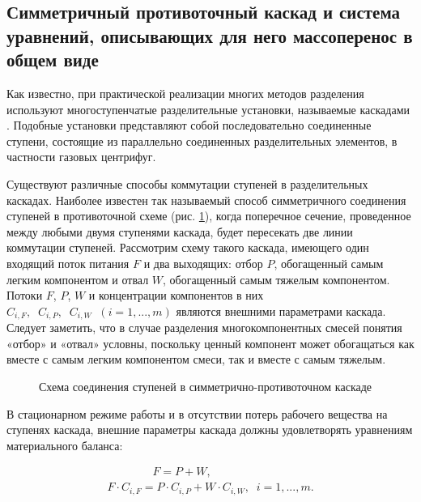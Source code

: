 \subsection{Симметричный противоточный каскад и система уравнений, описывающих для него массоперенос в общем виде}

Как известно, при практической реализации многих методов разделения используют многоступенчатые разделительные установки, называемые каскадами \cite{sulaberidzeTeoriyaKaskadovDlya2011}. Подобные установки представляют собой последовательно соединенные ступени, состоящие из параллельно соединенных разделительных элементов, в частности газовых центрифуг.

Существуют различные способы коммутации ступеней в разделительных каскадах. Наиболее известен так называемый способ симметричного соединения ступеней в противоточной схеме (рис. \ref{1_2}), когда поперечное сечение, проведенное между любыми двумя ступенями каскада, будет пересекать две линии коммутации ступеней. Рассмотрим схему такого каскада, имеющего один входящий поток питания $F$ и два выходящих: отбор $P$, обогащенный самым легким компонентом и отвал $W$, обогащенный самым тяжелым компонентом. Потоки $F$, $P$, $W$ и концентрации компонентов в них $C_{i,F} ,\; \; C_{i,P} ,\; \; C_{i,W} \; \; (i=1,...,m)$ являются внешними параметрами каскада. Следует заметить, что в случае разделения многокомпонентных смесей понятия «отбор» и «отвал» условны, поскольку ценный компонент может обогащаться как вместе с самым легким компонентом смеси, так и вместе с самым тяжелым.

\begin{figure}[ht]
  \caption{Схема соединения ступеней в симметрично-противоточном каскаде}\label{1_2}
\end{figure}

В стационарном режиме работы и в отсутствии потерь рабочего вещества на ступенях каскада, внешние параметры каскада должны удовлетворять уравнениям материального баланса:

\begin{equation} \label{GrindEQ__1_21_} 
  \begin{array}{l} {\quad \quad \quad \quad F=P+W,} \\ {F \cdot C_{i,F} =P \cdot C_{i,P} +W \cdot C_{i,W} ,\; \; i=1,...,m.} \end{array} 
\end{equation} 

